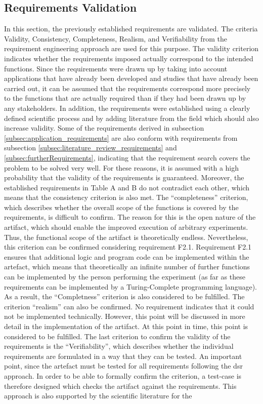 \newpage


\subsection{Requirements Validation}\label{subsec:requirement_validation}

In this section, the previously established requirements are validated. The criteria Validity, Consistency, Completeness, Realism, and Verifiability from the requirement engineering approach are used for this purpose. The validity criterion indicates whether the requirements imposed actually correspond to the intended functions. Since the requirements were drawn up by taking into account applications that have already been developed and studies that have already been carried out, it can be assumed that the requirements correspond more precisely to the functions that are actually required than if they had been drawn up by any stakeholders. In addition, the requirements were established using a clearly defined scientific process and by adding literature from the field which should also increase validity. Some of the requirements derived in subsection \ref{subsec:application_requirements} are also conform with requirements from subsection \ref{subsec:literature_review_requirements} and \ref{subsec:furtherRequirements}, indicating that the requirement search covers the problem to be solved very well. For these reasons, it is assumed with a high probability that the validity of the requirements is guaranteed. Moreover, the established requirements in Table A and B do not contradict each other, which means that the consistency criterion is also met. The \enquote{completeness} criterion, which describes whether the overall scope of the functions is covered by the requirements, is difficult to confirm. The reason for this is the open nature of the artifact, which should enable the improved execution of arbitrary experiments. Thus, the functional scope of the artifact is theoretically endless. Nevertheless, this criterion can be confirmed considering requirement F2.1. Requirement F2.1 ensures that additional logic and program code can be implemented within the artefact, which means that theoretically an infinite number of further functions can be implemented by the person performing the experiment (as far as these requirements can be implemented by a Turing-Complete programming language). As a result, the \enquote{Completness} criterion is also considered to be fulfilled. The criterion \enquote{realism} can also be confirmed. No requirement indicates that it could not be implemented technically. However, this point will be discussed in more detail in the implementation of the artifact. At this point in time, this point is considered to be fulfilled. The last criterion to confirm the validity of the requirements is the \enquote{Verifiability}, which describes whether the individual requirements are formulated in a way that they can be tested. An important point, since the artefact must be tested for all requirements following the \ac{dsr} approach. In order to be able to formally confirm the criterion, a test-case is therefore designed which checks the artifact against the requirements. This approach is also supported by the scientific literature for the 